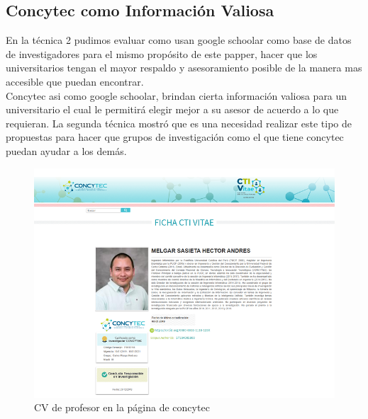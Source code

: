 \subsection{Concytec como Información Valiosa}
En la técnica 2 pudimos evaluar como usan google schoolar como base de datos de investigadores para el mismo propósito de este papper, hacer que los universitarios tengan el mayor respaldo y asesoramiento posible de la manera mas accesible que puedan encontrar.\\
Concytec asi como google schoolar, brindan cierta información valiosa para un universitario el cual le permitirá elegir mejor a su asesor de acuerdo a lo que requieran. La segunda técnica mostró que es una necesidad realizar este tipo de propuestas para hacer que grupos de investigación como el que tiene concytec puedan ayudar a los demás.
\begin{figure}[H]
    \centering
    \includegraphics[scale=0.6]{Graficos/concytec.png}
    \caption{CV de profesor en la página de concytec}
    \label{fig:att}
    \end{figure}